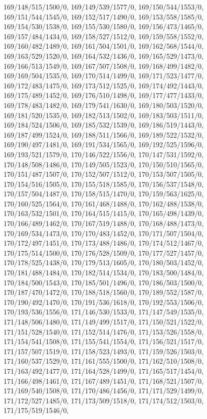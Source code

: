 {169/148/515/1500/0,%
169/149/539/1577/0,%
169/150/544/1553/0,%
169/151/544/1545/0,%
169/152/517/1490/0,%
169/153/558/1585/0,%
169/154/530/1538/0,%
169/155/530/1580/0,%
169/156/473/1465/0,%
169/157/484/1434/0,%
169/158/527/1512/0,%
169/159/558/1552/0,%
169/160/482/1489/0,%
169/161/504/1501/0,%
169/162/568/1544/0,%
169/163/529/1520/0,%
169/164/532/1436/0,%
169/165/529/1473/0,%
169/166/513/1549/0,%
169/167/507/1508/0,%
169/168/499/1482/0,%
169/169/504/1535/0,%
169/170/514/1499/0,%
169/171/523/1477/0,%
169/172/483/1475/0,%
169/173/512/1525/0,%
169/174/492/1443/0,%
169/175/489/1452/0,%
169/176/510/1498/0,%
169/177/477/1433/0,%
169/178/483/1482/0,%
169/179/541/1630/0,%
169/180/503/1520/0,%
169/181/520/1535/0,%
169/182/513/1502/0,%
169/183/503/1511/0,%
169/184/524/1506/0,%
169/185/532/1539/0,%
169/186/519/1443/0,%
169/187/499/1524/0,%
169/188/511/1566/0,%
169/189/522/1532/0,%
169/190/497/1481/0,%
169/191/534/1565/0,%
169/192/525/1596/0,%
169/193/521/1579/0,%
170/146/522/1556/0,%
170/147/531/1592/0,%
170/148/508/1486/0,%
170/149/505/1523/0,%
170/150/510/1565/0,%
170/151/487/1507/0,%
170/152/507/1512/0,%
170/153/507/1505/0,%
170/154/516/1505/0,%
170/155/518/1585/0,%
170/156/537/1548/0,%
170/157/504/1487/0,%
170/158/515/1470/0,%
170/159/563/1625/0,%
170/160/525/1564/0,%
170/161/468/1488/0,%
170/162/488/1538/0,%
170/163/532/1501/0,%
170/164/515/1415/0,%
170/165/498/1439/0,%
170/166/489/1462/0,%
170/167/519/1488/0,%
170/168/488/1473/0,%
170/169/534/1473/0,%
170/170/483/1452/0,%
170/171/507/1504/0,%
170/172/497/1451/0,%
170/173/488/1486/0,%
170/174/512/1467/0,%
170/175/514/1500/0,%
170/176/528/1509/0,%
170/177/527/1457/0,%
170/178/525/1438/0,%
170/179/513/1605/0,%
170/180/503/1452/0,%
170/181/488/1484/0,%
170/182/514/1534/0,%
170/183/500/1484/0,%
170/184/500/1543/0,%
170/185/501/1496/0,%
170/186/503/1500/0,%
170/187/470/1472/0,%
170/188/518/1560/0,%
170/189/552/1587/0,%
170/190/492/1470/0,%
170/191/536/1618/0,%
170/192/553/1506/0,%
170/193/536/1556/0,%
171/146/530/1533/0,%
171/147/549/1535/0,%
171/148/506/1480/0,%
171/149/499/1517/0,%
171/150/521/1522/0,%
171/151/528/1540/0,%
171/152/514/1476/0,%
171/153/526/1558/0,%
171/154/541/1508/0,%
171/155/541/1554/0,%
171/156/521/1517/0,%
171/157/507/1519/0,%
171/158/523/1493/0,%
171/159/526/1503/0,%
171/160/537/1529/0,%
171/161/555/1500/0,%
171/162/510/1508/0,%
171/163/492/1477/0,%
171/164/528/1499/0,%
171/165/517/1454/0,%
171/166/498/1461/0,%
171/167/489/1451/0,%
171/168/521/1507/0,%
171/169/540/1508/0,%
171/170/486/1456/0,%
171/171/529/1499/0,%
171/172/527/1485/0,%
171/173/509/1518/0,%
171/174/512/1503/0,%
171/175/519/1546/0,%
}
